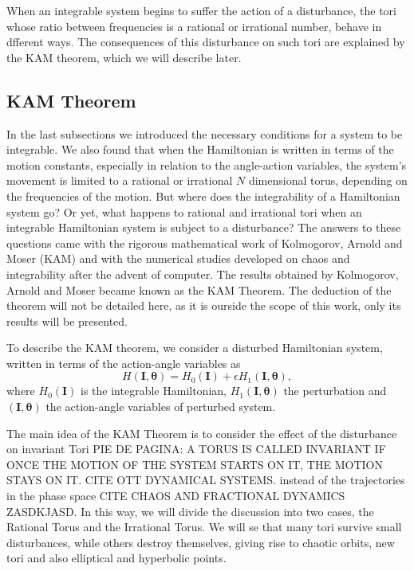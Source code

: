 When an integrable system begins to suffer the action of a disturbance, the tori whose ratio between frequencies is a rational or irrational number, behave in dfferent ways. The consequences of this disturbance on such tori  are explained by the KAM theorem, which we will describe later.


\subsection{KAM Theorem}
In the last subsections we introduced the necessary conditions for a system to be integrable. We also found that when the Hamiltonian is written in terms of the motion constants, especially in relation to the angle-action variables, the system's movement is limited to a rational or irrational $N$ dimensional torus, depending on the frequencies of the motion. But where does the integrability of a Hamiltonian system go? Or yet, what happens to rational and irrational tori when an integrable Hamiltonian system is subject to a disturbance? The answers to these questions came with the rigorous mathematical work of Kolmogorov, Arnold and Moser (KAM) and with the numerical studies developed on chaos and integrability after the advent of computer. The results obtained by Kolmogorov, Arnold and Moser became known as the KAM Theorem. The deduction of the theorem will not be detailed here, as it is ourside the scope of this work, only its results will be presented.\par

To describe the KAM theorem, we consider a disturbed Hamiltonian system, written in terms of the action-angle variables as
\begin{equation}
H(\bm{I},\bm{\theta})=H_0(\bm{I})+\epsilon H_1(\bm{I},\bm{\theta}),
\end{equation}
where $H_0(\bm{I})$ is the integrable Hamiltonian, $H_1(\bm{I},\bm{\theta})$ the perturbation and $(\bm{I},\bm{\theta})$ the action-angle variables of perturbed system.\par

The main idea of the KAM Theorem is to consider the effect of the disturbance on invariant Tori PIE DE PAGINA: A TORUS IS CALLED INVARIANT IF ONCE THE MOTION OF THE SYSTEM STARTS ON IT, THE MOTION STAYS ON IT. CITE OTT DYNAMICAL SYSTEMS. instead of the trajectories in the phase space CITE CHAOS AND FRACTIONAL DYNAMICS ZASDKJASD. In this way, we will divide the discussion into two cases, the Rational Torus and the Irrational Torus. We will se that many tori survive small disturbances, while others destroy themselves, giving rise to chaotic orbits, new tori and also elliptical and hyperbolic points.



